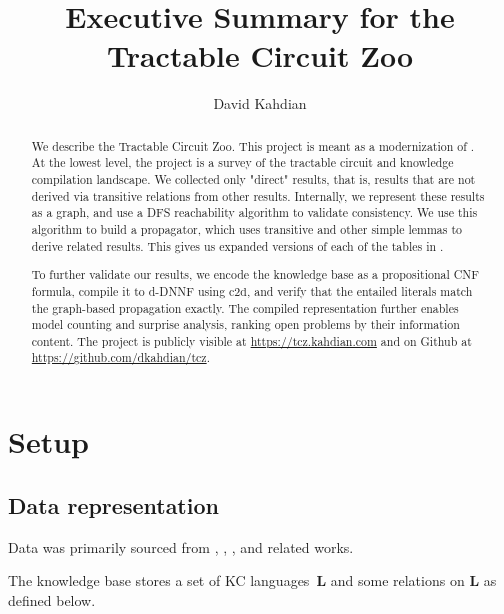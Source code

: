 \documentclass[10pt]{article}
\title{Executive Summary for the Tractable Circuit Zoo}
\author{David Kahdian}
\theoremstyle{plain}
\theoremstyle{definition}
\theoremstyle{remark}
\begin{document}
\maketitle

\begin{abstract}
We describe the Tractable Circuit Zoo. This project is meant as a modernization of \citet{Darwiche_2002}. At the lowest level, the project is a survey of the tractable circuit and knowledge compilation landscape. We collected only "direct" results, that is, results that are not derived via transitive relations from other results. Internally, we represent these results as a graph, and use a DFS reachability algorithm to validate consistency. We use this algorithm to build a propagator, which uses transitive and other simple lemmas to derive related results. This gives us expanded versions of each of the tables in \citet{Darwiche_2002}.

To further validate our results, we encode the knowledge base as a propositional CNF formula, compile it to d-DNNF using $\text{c2d}$, and verify that the entailed literals match the graph-based propagation exactly. The compiled representation further enables model counting and surprise analysis, ranking open problems by their information content. The project is publicly visible at \url{https://tcz.kahdian.com} and on Github at \url{https://github.com/dkahdian/tcz}.
\end{abstract}

\section{Setup}

\subsection{Data representation}
Data was primarily sourced from \citep{Darwiche_2002}, \citep{Amarilli_2020}, \citep{Bova_2016}, and related works.

The knowledge base stores a set of KC languages~$\textbf{L}$ and some relations on $\textbf{L}$ as defined below.
\end{document}
